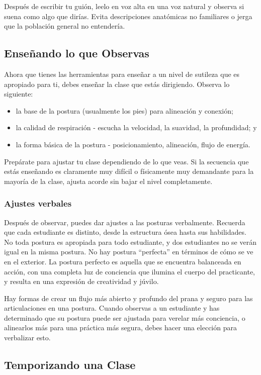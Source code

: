 Despu\'es de escribir tu guión, leelo en voz alta en una voz natural y observa si suena como algo que dirías. Evita descripciones anatómicas no familiares o jerga que la población general no entendería.

\subsection{Enseñando lo que Observas}
Ahora que tienes las herramientas para enseñar a un nivel de sutileza que es apropiado para ti, debes enseñar la clase que estás dirigiendo. Observa lo siguiente:

\begin{itemize}
	\item la base de la postura (usualmente los pies) para alineación y conexión;
	\item la calidad de respiración - escucha la velocidad, la suavidad, la profundidad; y
	\item la forma básica de la postura - posicionamiento, alineación, flujo de energía.
\end{itemize}

Prepárate para ajustar tu clase dependiendo de lo que veas. Si la secuencia que estás enseñando es claramente muy difícil o físicamente muy demandante para la mayoría de la clase, ajusta acorde sin bajar el nivel completamente.

\subsubsection{Ajustes verbales}
Despu\'es de observar, puedes dar ajustes a las posturas verbalmente. Recuerda que cada estudiante es distinto, desde la estructura ósea hasta sus habilidades. No toda postura es apropiada para todo estudiante, y dos estudiantes no se verán igual en la misma postura. No hay postura ``perfecta'' en t\'erminos de cómo se ve en el exterior. La postura perfecto es aquella que se encuentra balanceada en acción, con una completa luz de conciencia que ilumina el cuerpo del practicante, y resulta en una expresión de creatividad y júvilo.

Hay formas de crear un flujo más abierto y profundo del prana y seguro para las articulaciones en una postura. Cuando observas a un estudiante y has determinado que su postura puede ser ajustada para verelar más conciencia, o alinearlos más para una práctica más segura, debes hacer una elección para verbalizar esto.


\subsection{Temporizando una Clase}
